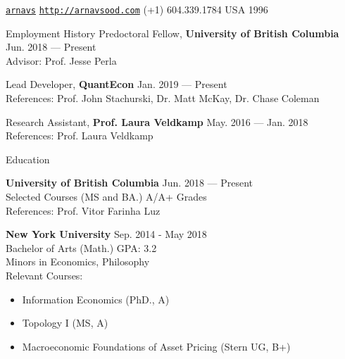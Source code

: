 \documentclass{resume} %
\begin{document}
 \href{https://github.com/arnavs}{\tt arnavs} \vline \hspace{0.5 em} {} \href{http://arnavsood.com}{\tt http://arnavsood.com} \vline \hspace{0.5 em}  (+1) 604.339.1784 \vline \hspace{0.5 em}  USA \vline \hspace{0.5 em}  1996

\begin{rSection}{Employment History}
Predoctoral Fellow, {\bf University of British Columbia} \hfill {Jun. 2018 --- Present} 
\\ Advisor: Prof. Jesse Perla \smallskip 

Lead Developer, {\bf QuantEcon} \hfill {Jan. 2019 --- Present}
\\ References: Prof. John Stachurski, Dr. Matt McKay, Dr. Chase Coleman

Research Assistant, {\bf Prof. Laura Veldkamp} \hfill {May. 2016 --- Jan. 2018}
\\ References: Prof. Laura Veldkamp 
\end{rSection}


\begin{rSection}{Education}

{\bf University of British Columbia} \hfill {Jun. 2018 --- Present} 
\\ Selected Courses (MS and BA.)  \hfill { A/A+ Grades }
\\ References: Prof. Vitor Farinha Luz

{\bf New York University} \hfill {Sep. 2014 - May 2018} 
\\ Bachelor of Arts (Math.) \hfill { GPA: 3.2 } 
\\ Minors in Economics, Philosophy 
\\ Relevant Courses: 
\begin{itemize}[noitemsep, nolistsep]
    \item Information Economics (PhD., A) 
    \item Topology I (MS, A)
    \item Macroeconomic Foundations of Asset Pricing (Stern UG, B+)
\end{itemize}

\end{rSection}
\end{document}
